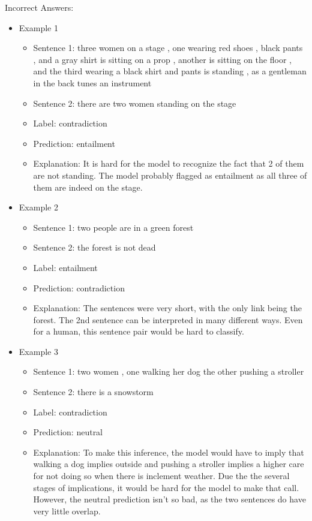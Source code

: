 \documentclass[a4paper,10pt]{article}
\begin{document}
\par
\justify
Incorrect Answers:
\begin{itemize}
\item Example 1
	\begin{itemize}
	\item Sentence 1: three women on a stage , one wearing red shoes , black pants , and a gray shirt is sitting on a prop , another is sitting on the floor , and the third wearing a black shirt and pants is standing , as a gentleman in the back tunes an instrument
	\item Sentence 2: there are two women standing on the stage 
	\item Label: contradiction
	\item Prediction: entailment
	\item Explanation: It is hard for the model to recognize the fact that 2 of them are not standing. The model probably flagged as entailment as all three of them are indeed on the stage.
	\end{itemize}
\end{itemize}

\begin{itemize}
\item Example 2
	\begin{itemize}
	\item Sentence 1: two people are in a green forest
	\item Sentence 2: the forest is not dead
	\item Label: entailment
	\item Prediction: contradiction
	\item Explanation: The sentences were very short, with the only link being the forest. The 2nd sentence can be interpreted in many different ways. Even for a human, this sentence pair would be hard to classify.
	\end{itemize}
\end{itemize}

\begin{itemize}
\item Example 3
	\begin{itemize}
	\item Sentence 1: two women , one walking her dog the other pushing a stroller
	\item Sentence 2: there is a snowstorm
	\item Label: contradiction
	\item Prediction: neutral
	\item Explanation: To make this inference, the model would have to imply that walking a dog implies outside and pushing a stroller implies a higher care for not doing so when there is inclement weather. Due the the several stages of implications, it would be hard for the model to make that call. However, the neutral prediction isn't so bad, as the two sentences do have very little overlap.
	\end{itemize}
\end{itemize}
\end{document}
